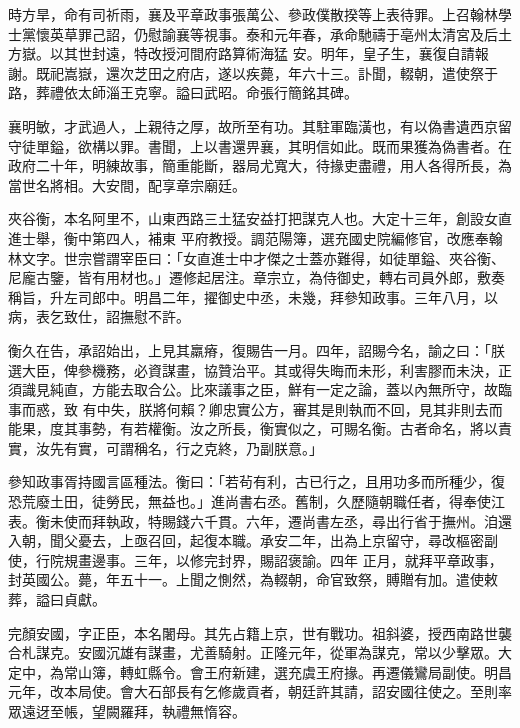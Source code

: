 \begin{pinyinscope}
 時方旱，命有司祈雨，襄及平章政事張萬公、參政僕散揆等上表待罪。上召翰林學士黨懷英草罪己詔，仍慰諭襄等視事。泰和元年春，承命馳禱于亳州太清宮及后土方嶽。以其世封遠，特改授河間府路算術海猛
 安。明年，皇子生，襄復自請報謝。既祀嵩嶽，還次芝田之府店，遂以疾薨，年六十三。訃聞，輟朝，遣使祭于路，葬禮依太師淄王克寧。謚曰武昭。命張行簡銘其碑。



 襄明敏，才武過人，上親待之厚，故所至有功。其駐軍臨潢也，有以偽書遺西京留守徒單鎰，欲構以罪。書聞，上以書還畀襄，其明信如此。既而果獲為偽書者。在政府二十年，明練故事，簡重能斷，器局尤寬大，待掾吏盡禮，用人各得所長，為當世名將相。大安間，配享章宗廟廷。



 夾谷衡，本名阿里不，山東西路三土猛安益打把謀克人也。大定十三年，創設女直進士舉，衡中第四人，補東
 平府教授。調范陽簿，選充國史院編修官，改應奉翰林文字。世宗嘗謂宰臣曰：「女直進士中才傑之士蓋亦難得，如徒單鎰、夾谷衡、尼龐古鑒，皆有用材也。」遷修起居注。章宗立，為侍御史，轉右司員外郎，敷奏稱旨，升左司郎中。明昌二年，擢御史中丞，未幾，拜參知政事。三年八月，以病，表乞致仕，詔撫慰不許。



 衡久在告，承詔始出，上見其羸瘠，復賜告一月。四年，詔賜今名，諭之曰：「朕選大臣，俾參機務，必資謀畫，協贊治平。其或得失晦而未形，利害膠而未決，正須識見純直，方能去取合公。比來議事之臣，鮮有一定之論，蓋以內無所守，故臨事而惑，致
 有中失，朕將何賴？卿忠實公方，審其是則執而不回，見其非則去而能果，度其事勢，有若權衡。汝之所長，衡實似之，可賜名衡。古者命名，將以責實，汝先有實，可謂稱名，行之克終，乃副朕意。」



 參知政事胥持國言區種法。衡曰：「若茍有利，古已行之，且用功多而所種少，復恐荒廢土田，徒勞民，無益也。」進尚書右丞。舊制，久歷隨朝職任者，得奉使江表。衡未使而拜執政，特賜錢六千貫。六年，遷尚書左丞，尋出行省于撫州。洎還入朝，聞父憂去，上亟召回，起復本職。承安二年，出為上京留守，尋改樞密副使，行院規畫邊事。三年，以修完封界，賜詔褒諭。四年
 正月，就拜平章政事，封英國公。薨，年五十一。上聞之惻然，為輟朝，命官致祭，賻贈有加。遣使敕葬，謚曰貞獻。



 完顏安國，字正臣，本名闍母。其先占籍上京，世有戰功。祖斜婆，授西南路世襲合札謀克。安國沉雄有謀畫，尤善騎射。正隆元年，從軍為謀克，常以少擊眾。大定中，為常山簿，轉虹縣令。會王府新建，選充虞王府掾。再遷儀鸞局副使。明昌元年，改本局使。會大石部長有乞修歲貢者，朝廷許其請，詔安國往使之。至則率眾遠迓至帳，望闕羅拜，執禮無惰容。




\end{pinyinscope}
